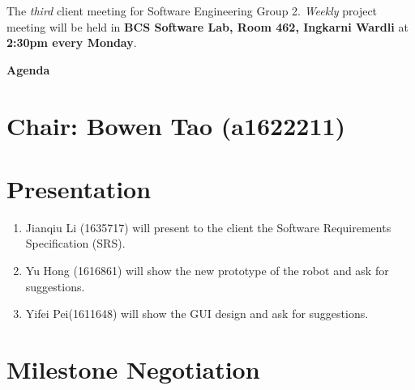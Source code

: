\documentclass[11pt, a4paper]{article}
\begin{document}
\noindent The {\em third} client meeting for Software Engineering Group 2. {\em Weekly} project meeting will be held in {\bf BCS Software Lab, Room 462, Ingkarni Wardli} at {\bf 2:30pm every Monday}.


\vspace*{15pt}

\begin{center}
\huge \bf Agenda
\end{center}



\section*{Chair: Bowen Tao \large (a1622211)}

\vspace*{15pt}


\section{Presentation}

\begin {enumerate}
\item Jianqiu Li (1635717) will present to the client the Software Requirements Specification (SRS).

\item Yu Hong (1616861) will show the new prototype of the robot and ask for suggestions.

\item Yifei Pei(1611648) will show the GUI design and ask for suggestions.
\end {enumerate}

\section{Milestone Negotiation}
\end{document}
